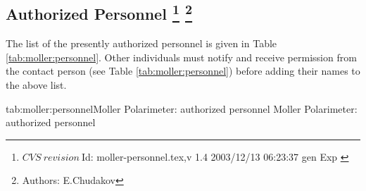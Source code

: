 \begin{safetyen}{0}{0}
\section[Authorized  Personnel]{Authorized  Personnel
\footnote{
   $CVS~revision~ $Id: moller-personnel.tex,v 1.4 2003/12/13 06:23:37 gen Exp $ $
 }
\footnote{Authors: E.Chudakov }
}
\end{safetyen}
The list
of the presently authorized personnel is given in Table \ref{tab:moller:personnel}.
Other individuals must notify and receive permission from
the contact person (see Table \ref{tab:moller:personnel}) before adding their names 
to the above list.

\begin{namestab}{tab:moller:personnel}{Moller Polarimeter: authorized personnel}{%
   Moller Polarimeter: authorized personnel}
  \OleksandrGlamazdin{}
  \ViktorGorbenko{}
  \RomanPomatsalyuk{}
\end{namestab}
                  

%
%
%
%
%
